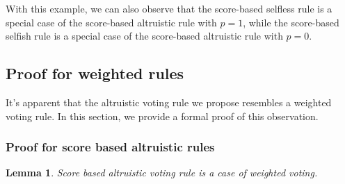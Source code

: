 \documentclass{article}
\newtheorem{lemma}[theorem]{Lemma}
\begin{document}
With this example, we can also observe that the score-based selfless rule is a special case of the score-based altruistic rule with \( p = 1 \), while the score-based selfish rule is a special case of the score-based altruistic rule with \( p = 0 \).





\subsection{Proof for weighted rules}
It's apparent that the altruistic voting rule we propose resembles a weighted voting rule. In this section, we provide a formal proof of this observation.

\subsubsection{Proof for score based altruistic rules}
\begin{lemma}
    Score based altruistic voting rule is a case of  weighted voting.
\end{lemma}
\end{document}

